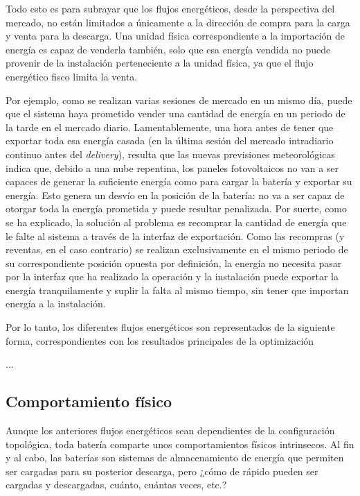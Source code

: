 Todo esto es para subrayar que los flujos energéticos, desde la perspectiva del mercado, no están limitados a únicamente a la dirección de compra para la carga y venta para la descarga. Una unidad física correspondiente a la importación de energía es capaz de venderla también, solo que esa energía vendida no puede provenir de la instalación perteneciente a la unidad física, ya que el flujo energético fisco limita la venta.

Por ejemplo, como se realizan varias sesiones de mercado en un mismo día, puede que el sistema haya prometido vender una cantidad de energía en un periodo de la tarde en el mercado diario. Lamentablemente, una hora antes de tener que exportar toda esa energía casada (en la última sesión del mercado intradiario continuo antes del \textit{delivery}), resulta que las nuevas previsiones meteorológicas indica que, debido a una nube repentina, los paneles fotovoltaicos no van a ser capaces de generar la suficiente energía como para cargar la batería y exportar su energía. Esto genera un desvío en la posición de la batería: no va a ser capaz de otorgar toda la energía prometida y puede resultar penalizada. Por suerte, como se ha explicado, la solución al problema es recomprar la cantidad de energía que le falte al sistema a través de la interfaz de exportación. Como las recompras (y reventas, en el caso contrario) se realizan exclusivamente en el mismo periodo de su correspondiente posición opuesta por definición, la energía no necesita pasar por la interfaz que ha realizado la operación y la instalación puede exportar la energía tranquilamente y suplir la falta al mismo tiempo, sin tener que importan energía a la instalación.

Por lo tanto, los diferentes flujos energéticos son representados de la siguiente forma, correspondientes con los resultados principales de la optimización

...

\subsection{Comportamiento físico}
\label{makereference5.1.3}

Aunque los anteriores flujos energéticos sean dependientes de la configuración topológica, toda batería comparte unos comportamientos físicos intrinsecos. Al fin y al cabo, las baterías son sistemas de almacenamiento de energía que permiten ser cargadas para su posterior descarga, pero ¿cómo de rápido pueden ser cargadas y descargadas, cuánto, cuántas veces, etc.?

